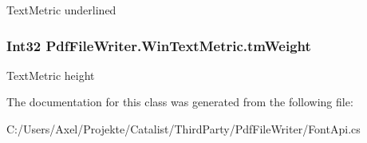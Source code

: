 Text\+Metric underlined 

\subsubsection[{\texorpdfstring{tm\+Weight}{tmWeight}}]{\setlength{\rightskip}{0pt plus 5cm}Int32 Pdf\+File\+Writer.\+Win\+Text\+Metric.\+tm\+Weight\hspace{0.3cm}{\ttfamily [get]}}\hypertarget{class_pdf_file_writer_1_1_win_text_metric_a2da79132edc1d90df886d2ecdeeedc5b}{}\label{class_pdf_file_writer_1_1_win_text_metric_a2da79132edc1d90df886d2ecdeeedc5b}


Text\+Metric height 



The documentation for this class was generated from the following file\+:\begin{DoxyCompactItemize}
\item 
C\+:/\+Users/\+Axel/\+Projekte/\+Catalist/\+Third\+Party/\+Pdf\+File\+Writer/Font\+Api.\+cs\end{DoxyCompactItemize}

